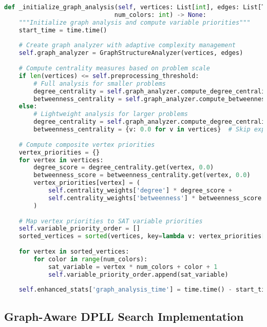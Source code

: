 \begin{lstlisting}[language=Python, caption=Centrality-Based Variable Priority System]
def _initialize_graph_analysis(self, vertices: List[int], edges: List[Tuple[int, int]], 
                              num_colors: int) -> None:
    """Initialize graph analysis and compute variable priorities"""
    start_time = time.time()
    
    # Create graph analyzer with adaptive complexity management
    self.graph_analyzer = GraphStructureAnalyzer(vertices, edges)
    
    # Compute centrality measures based on problem scale
    if len(vertices) <= self.preprocessing_threshold:
        # Full analysis for smaller problems
        degree_centrality = self.graph_analyzer.compute_degree_centrality()
        betweenness_centrality = self.graph_analyzer.compute_betweenness_centrality()
    else:
        # Lightweight analysis for larger problems
        degree_centrality = self.graph_analyzer.compute_degree_centrality()
        betweenness_centrality = {v: 0.0 for v in vertices}  # Skip expensive computation
    
    # Compute composite vertex priorities
    vertex_priorities = {}
    for vertex in vertices:
        degree_score = degree_centrality.get(vertex, 0.0)
        betweenness_score = betweenness_centrality.get(vertex, 0.0)
        vertex_priorities[vertex] = (
            self.centrality_weights['degree'] * degree_score + 
            self.centrality_weights['betweenness'] * betweenness_score
        )
    
    # Map vertex priorities to SAT variable priorities
    self.variable_priority_order = []
    sorted_vertices = sorted(vertices, key=lambda v: vertex_priorities[v], reverse=True)
    
    for vertex in sorted_vertices:
        for color in range(num_colors):
            sat_variable = vertex * num_colors + color + 1
            self.variable_priority_order.append(sat_variable)
    
    self.enhanced_stats['graph_analysis_time'] = time.time() - start_time
\end{lstlisting}

\subsection{Graph-Aware DPLL Search Implementation}
\label{appendix:graph-aware-search}

